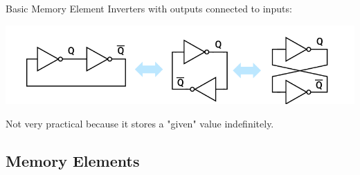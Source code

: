     \begin{parag}{Basic Memory Element}
        Inverters with outputs connected to inputs:
        \begin{center}
            \includegraphics[]{32025-03-31.png}
        \end{center}
        
       Not very practical because it stores a "given" value indefinitely.
    
    \end{parag}
    \subsection{Memory Elements}
